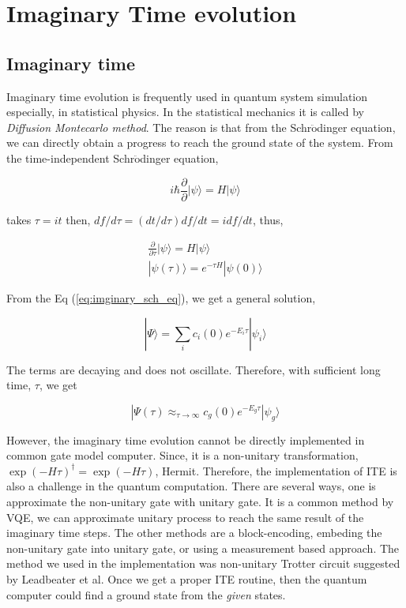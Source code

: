 \chapter{Imaginary Time evolution}


\section{Imaginary time}

Imaginary time evolution is frequently used in 
quantum system simulation especially, in statistical 
physics. 
In the statistical mechanics it is called by 
\textit{Diffusion Montecarlo method}. 
The reason is that from the Schr$\ddot{\mbox{o}}$dinger equation,
we can directly obtain a progress to reach the ground state of the system.
From the time-independent Schr$\ddot{\mbox{o}}$dinger equation, 

\begin{equation}
    i \hbar \frac{\partial}{\partial}| \psi \rangle = H |\psi \rangle
\end{equation}

takes $\tau = i t$  then, $df/d\tau = (dt/d\tau) df/dt = i df/dt$, thus,

\begin{align}
    \frac{\partial}{\partial \tau} | \psi \rangle = H | \psi \rangle \label{eq:imginary_sch_eq}\\
    | \psi(\tau) \rangle = e^{- \tau H} | \psi(0) \rangle
\end{align}

From the Eq (\ref{eq:imginary_sch_eq}), we get a general solution,

\begin{equation}
    |\Psi \rangle = \sum_{i} c_i(0) e^{- E_i \tau} | \psi_i \rangle
\end{equation}

The terms are decaying and does not oscillate. Therefore, with sufficient long time, $\tau$, 
we get 

\begin{equation}
    |\Psi(\tau) \approx_{\tau \rightarrow \infty} c_g(0) e^{- E_g \tau} | \psi_g \rangle
\end{equation}

However, the imaginary time evolution cannot be directly 
implemented in common gate model computer. 
Since, it is a non-unitary transformation, $\exp(-H \tau)^\dagger = \exp(-H \tau)$, Hermit. 
Therefore, the implementation of ITE is also a challenge in the quantum computation.
There are several ways, one is approximate the non-unitary gate with unitary gate.
It is a common method by VQE, we can approximate unitary process to reach the same result 
of the imaginary time steps. 
The other methods are a block-encoding, embeding the non-unitary gate into unitary gate, or
using a measurement based approach. 
The method we used in the implementation was non-unitary Trotter circuit suggested by Leadbeater et al\cite{leadbeater_non-unitary_2023}.
Once we get a proper ITE routine, then the quantum computer could find a ground state from 
the \textit{given} states.

